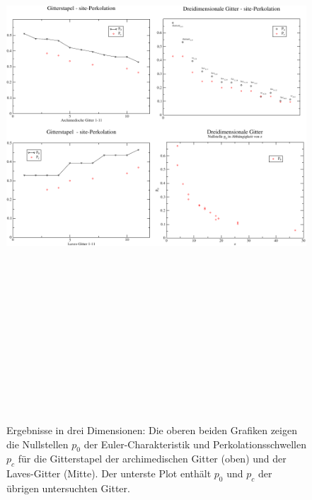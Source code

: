 \begin{figure}[htbp]
  \centering
  \includegraphics[height=22cm]{./Schranken-figs/3d}
  \caption{Ergebnisse in drei Dimensionen: Die oberen beiden Grafiken zeigen die Nullstellen $p_0$ der Euler-Charakteristik und Perkolationsschwellen $p_c$ f\"ur die Gitterstapel der archimedischen Gitter (oben) und der Laves-Gitter (Mitte). Der unterste Plot enth\"alt $p_0$ und $p_c$ der \"ubrigen untersuchten Gitter.}
  \label{fig:3dallplots}
\end{figure}
